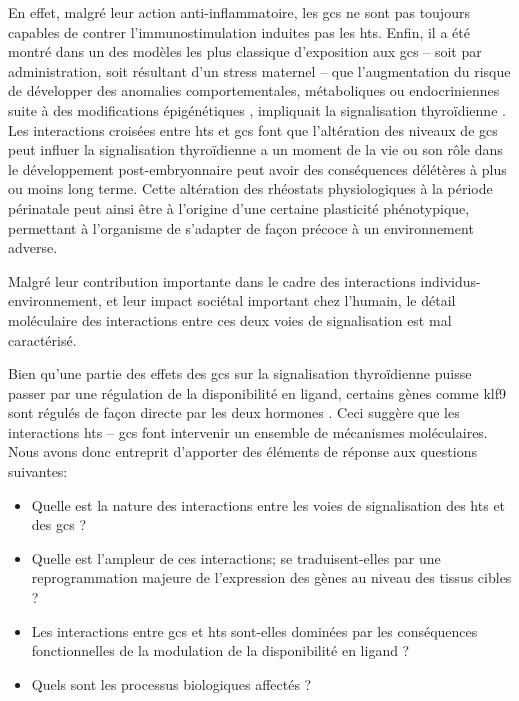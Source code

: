 \documentclass[../main.tex]{subfiles}
\begin{document}
		En effet, malgré leur action anti-inflammatoire, les \glspl{gc} ne sont pas toujours capables de contrer l'immunostimulation induites pas les \glspl{ht}.
		Enfin, il a été montré dans un des modèles les plus classique d'exposition aux \glspl{gc} – soit par administration, soit résultant d'un stress maternel – que l'augmentation du risque de développer des anomalies comportementales, métaboliques ou endocriniennes suite à des modifications épigénétiques \cite{Weaver2004}, impliquait la signalisation thyroïdienne \citep{Hellstrom2012}.
		Les interactions croisées entre \glspl{ht} et \glspl{gc} font que l'altération des niveaux de \glspl{gc} peut influer la signalisation thyroïdienne a un moment de la vie ou son rôle dans le développement post-embryonnaire peut avoir des conséquences délétères à plus ou moins long terme.
		Cette altération des rhéostats physiologiques à la période périnatale peut ainsi être à l'origine d'une certaine plasticité phénotypique, permettant à l'organisme de s'adapter de façon précoce à un environnement adverse.
		\par
		Malgré leur contribution importante dans le cadre des interactions individus-environnement, et leur impact sociétal important chez l'humain, le détail moléculaire des interactions entre ces deux voies de signalisation est mal caractérisé.
		\par
		Bien qu'une partie des effets des \glspl{gc} sur la signalisation thyroïdienne puisse passer par une régulation de la disponibilité en ligand, certains gènes comme \gls{klf9} sont régulés de façon directe par les deux hormones \citep{Denver2009b,Bagamasbad2012}.
		Ceci suggère que les interactions \glspl{ht} – \glspl{gc} font intervenir un ensemble de mécanismes moléculaires.
		Nous avons donc entreprit d'apporter des éléments de réponse aux questions suivantes:
		\begin{itemize}
			\item
				Quelle est la nature des interactions entre les voies de signalisation des \glspl{ht} et des \glspl{gc} ?
			\item
				Quelle est l'ampleur de ces interactions; se traduisent-elles par une reprogrammation majeure de l'expression des gènes au niveau des tissus cibles ?
			\item
				Les interactions entre \glspl{gc} et \glspl{ht} sont-elles dominées par les conséquences fonctionnelles de la modulation de la disponibilité en ligand ?
			\item
				Quels sont les processus biologiques affectés ?
		\end{itemize}
\end{document}
